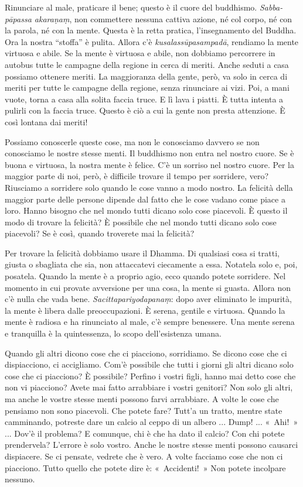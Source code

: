 Rinunciare al male, praticare il bene; questo è il cuore del buddhismo.
\emph{Sabba-pāpassa akaraṇaṃ}, non commettere nessuna cattiva azione, né
col corpo, né con la parola, né con la mente. Questa è la retta pratica,
l'insegnamento del Buddha. Ora la nostra ``stoffa'' è pulita. Allora c'è
\emph{kusalassūpasampadā}, rendiamo la mente virtuosa e abile. Se la
mente è virtuosa e abile, non dobbiamo percorrere in autobus tutte le
campagne della regione in cerca di meriti. Anche seduti a casa possiamo
ottenere meriti. La maggioranza della gente, però, va solo in cerca di
meriti per tutte le campagne della regione, senza rinunciare ai vizi.
Poi, a mani vuote, torna a casa alla solita faccia truce. E lì lava i
piatti. È tutta intenta a pulirli con la faccia truce. Questo è ciò a
cui la gente non presta attenzione. È così lontana dai meriti!

Possiamo conoscerle queste cose, ma non le conosciamo davvero se non
conosciamo le nostre stesse menti. Il buddhismo non entra nel nostro
cuore. Se è buona e virtuosa, la nostra mente è felice. C'è un sorriso
nel nostro cuore. Per la maggior parte di noi, però, è difficile trovare
il tempo per sorridere, vero? Riusciamo a sorridere solo quando le cose
vanno a modo nostro. La felicità della maggior parte delle persone
dipende dal fatto che le cose vadano come piace a loro. Hanno bisogno
che nel mondo tutti dicano solo cose piacevoli. È questo il modo di
trovare la felicità? È possibile che nel mondo tutti dicano solo cose
piacevoli? Se è così, quando troverete mai la felicità?

Per trovare la felicità dobbiamo usare il Dhamma. Di qualsiasi cosa si
tratti, giusta o sbagliata che sia, non attaccatevi ciecamente a essa.
Notatela solo e, poi, posatela. Quando la mente è a proprio agio, ecco
quando potete sorridere. Nel momento in cui provate avversione per una
cosa, la mente si guasta. Allora non c'è nulla che vada bene.
\emph{Sacittapariyodapanaṃ}: dopo aver eliminato le impurità, la mente è
libera dalle preoccupazioni. È serena, gentile e virtuosa. Quando la
mente è radiosa e ha rinunciato al male, c'è sempre benessere. Una mente
serena e tranquilla è la quintessenza, lo scopo dell'esistenza umana.

Quando gli altri dicono cose che ci piacciono, sorridiamo. Se dicono
cose che ci dispiacciono, ci accigliamo. Com'è possibile che tutti i
giorni gli altri dicano solo cose che ci piacciono? È possibile? Perfino
i vostri figli, hanno mai detto cose che non vi piacciono? Avete mai
fatto arrabbiare i vostri genitori? Non solo gli altri, ma anche le
vostre stesse menti possono farvi arrabbiare. A volte le cose che
pensiamo non sono piacevoli. Che potete fare? Tutt'a un tratto, mentre
state camminando, potreste dare un calcio al ceppo di un albero ...
Dump! ... «~Ahi!~» ... Dov'è il problema? E comunque, chi è che ha dato
il calcio? Con chi potete prendervela? L'errore è solo vostro. Anche le
nostre stesse menti possono causarci dispiacere. Se ci pensate, vedrete
che è vero. A volte facciamo cose che non ci piacciono. Tutto quello che
potete dire è: «~Accidenti!~» Non potete incolpare nessuno.


